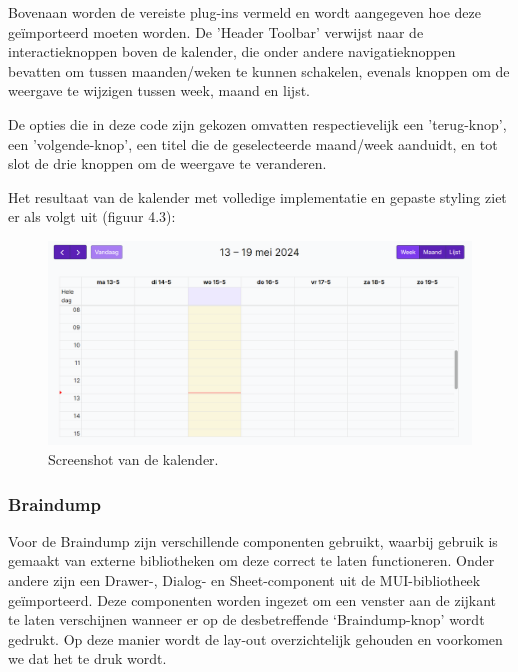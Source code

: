 Bovenaan worden de vereiste plug-ins vermeld en wordt aangegeven hoe deze geïmporteerd moeten worden. De 'Header Toolbar' verwijst naar de interactieknoppen boven de kalender, die onder andere navigatieknoppen bevatten om tussen maanden/weken te kunnen schakelen, evenals knoppen om de weergave te wijzigen tussen week, maand en lijst. \newline

De opties die in deze code zijn gekozen omvatten respectievelijk een 'terug-knop', een 'volgende-knop', een titel die de geselecteerde maand/week aanduidt, en tot slot de drie knoppen om de weergave te veranderen.\newline

Het resultaat van de kalender met volledige implementatie en gepaste styling ziet er als volgt uit (figuur 4.3):

\begin{figure}[h]
    \centering
    \includegraphics[width=\textwidth]{graphics/screenshot_kalender.png}
    \caption{Screenshot van de kalender.}
    \label{fig:screenshot_kalender}
\end{figure}


\subsubsection{Braindump}

Voor de Braindump zijn verschillende componenten gebruikt, waarbij gebruik is gemaakt van externe bibliotheken om deze correct te laten functioneren. Onder andere zijn een Drawer-, Dialog- en Sheet-component uit de MUI-bibliotheek geïmporteerd. Deze componenten worden ingezet om een venster aan de zijkant te laten verschijnen wanneer er op de desbetreffende ‘Braindump-knop’ wordt gedrukt. Op deze manier wordt de lay-out overzichtelijk gehouden en voorkomen we dat het te druk wordt.\newline

